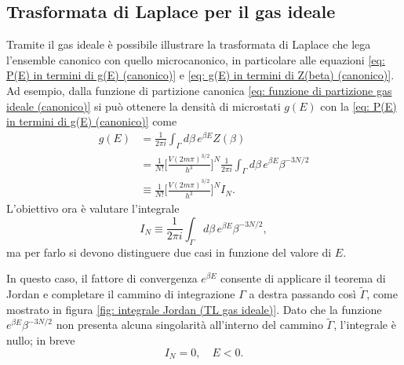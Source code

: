 \subsection{Trasformata di Laplace per il gas ideale}
Tramite il gas ideale è possibile illustrare la trasformata di Laplace che lega l'ensemble canonico con quello microcanonico, in particolare alle equazioni \eqref{eq: P(E) in termini di g(E) (canonico)} e  \eqref{eq: g(E) in termini di Z(beta) (canonico)}. Ad esempio, dalla funzione di partizione canonica \eqref{eq: funzione di partizione gas ideale (canonico)} si può ottenere la densità di microstati $g(E)$ con la \eqref{eq: P(E) in termini di g(E) (canonico)} come
\begin{equation}
\label{eq: densità di microstati (canonico)}
    \begin{split}
        g(E) &= \frac{1}{2\pi i}\int_\Gamma d\beta\,e^{\beta E}Z(\beta) \\
        &= \frac{1}{N!}\bigg[\frac{V(2m\pi)^{3/2}}{h^3}\bigg]^N\frac{1}{2\pi i}\int_\Gamma d\beta\,e^{\beta E}\beta^{-3N/2} \\
        &\equiv \frac{1}{N!}\bigg[\frac{V(2m\pi)^{3/2}}{h^3}\bigg]^N I_N.
    \end{split}
\end{equation}
L'obiettivo ora è valutare l'integrale 
\begin{equation}
\label{eq: integrale IN (canonico)}
    I_N \equiv \frac{1}{2\pi i}\int_\Gamma d\beta\,e^{\beta E}\beta^{-3N/2},
\end{equation}
ma per farlo si devono distinguere due casi in funzione del valore di $E$.
\begin{caso}[$E < 0$]
    In questo caso, il fattore di convergenza $e^{\beta E}$ consente di applicare il teorema di Jordan e completare il cammino di integrazione $\Gamma$ a destra passando così $\tilde{\Gamma}$, come mostrato in figura \ref{fig: integrale Jordan (TL gas ideale)}. Dato che la funzione $e^{\beta E}\beta^{-3N/2}$ non presenta alcuna singolarità all'interno del cammino $\tilde{\Gamma}$, l'integrale è nullo; in breve
    \begin{equation}
    \label{eq: integrale IN per E < 0}
        I_N = 0,\quad E < 0.
    \end{equation}
\end{caso}
